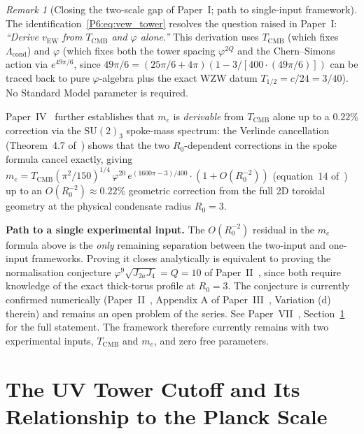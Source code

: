 \documentclass[11pt,a4paper]{article}
\theoremstyle{definition}
\theoremstyle{remark}
\newtheorem{remark}[theorem]{Remark}
\newcommand{\vp}{\varphi}
\newcommand{\Ja}{J_{2a}}
\newcommand{\Jfour}{J_{4}}
\newcommand{\TCMB}{T_{\mathrm{CMB}}}
\newcommand{\vEW}{v_{\mathrm{EW}}}
\newcommand{\Lcond}{\Lambda_{\mathrm{cond}}}
\begin{document}
\begin{remark}[Closing the two-scale gap of Paper~I; path to single-input framework]
\label{P6:rem:single_input_remark}
The identification~\eqref{P6:eq:vew_tower} resolves the question raised in
Paper~I: \emph{``Derive $\vEW$ from $\TCMB$ and $\vp$ alone.''}
This derivation uses $\TCMB$ (which fixes $\Lcond$) and $\vp$ (which
fixes both the tower spacing $\vp^{2Q}$ and the Chern--Simons action
via $e^{49\pi/6}$, since $49\pi/6 = (25\pi/6 + 4\pi)(1 - 3/[400 \cdot
(49\pi/6)])$ can be traced back to pure $\vp$-algebra plus the exact
WZW datum $T_{1/2} = c/24 = 3/40$).  No Standard Model parameter is
required.

Paper~IV~\cite{Paper4} further establishes that $m_e$ is \emph{derivable} from
$\TCMB$ alone up to a $0.22\%$ correction via the $\mathrm{SU}(2)_3$
spoke-mass spectrum: the Verlinde cancellation
(Theorem~4.7 of~\cite{Paper4}) shows that the
two $R_0$-dependent corrections in the spoke formula cancel exactly,
giving $m_e = \TCMB(\pi^2/150)^{1/4}\,\vp^{20}\,e^{(1600\pi-3)/400}
\cdot(1+O(R_0^{-2}))$ (equation~14 of~\cite{Paper4})
up to an $O(R_0^{-2})\approx0.22\%$ geometric correction from the full
2D toroidal geometry at the physical condensate radius $R_0=3$.

\textbf{Path to a single experimental input.}
The $O(R_0^{-2})$ residual in the $m_e$ formula above is the
\emph{only} remaining separation between the two-input and one-input
frameworks.  Proving it closes analytically is equivalent to
proving the normalisation conjecture $\vp^9\sqrt{\Ja\Jfour}=Q=10$
of Paper~II~\cite{Paper2}, since both require knowledge of the exact
thick-torus profile at $R_0=3$.  The conjecture is currently confirmed
numerically (Paper~II~\cite{Paper2}, Appendix A of Paper~III~\cite{Paper3},
Variation (d) therein) and remains an open
problem of the series.  See Paper~VII~\cite{Paper7},
Section~\ref{P6:sec:open} for the full statement. The framework therefore currently remains with two experimental inputs, $\TCMB$ and $m_e$, and zero free parameters.

\end{remark}

\section{The UV Tower Cutoff and Its Relationship to the Planck Scale}
\label{P6:sec:open}
\end{document}
